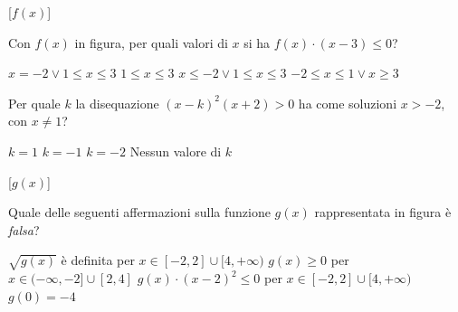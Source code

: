 \documentclass[10pt]{article}
\begin{document}
\smallskip
\noindent
\begin{minipage}[c]{.35\linewidth}
  \centering
  \begin{ftplot}[quiz, xmin=-3.9, xmax=3.9, ymin=-3.9, ymax=3.9, legend pos=north west]
    [$f(x)$]
  \end{ftplot}
\end{minipage}\hfill
\begin{minipage}[c]{.64\linewidth}
  \begin{parts}[ragged]
    \itemx[pts=0.5, diff=3] Con $f(x)$ in figura, per quali valori di $x$ si ha $f(x) \cdot (x - 3) \leq 0$?
      \begin{choices}
        \correct $x = -2 \lor 1 \leq x \leq 3$
        \choice $1 \leq x \leq 3$
        \choice $x \leq -2 \lor 1 \leq x \leq 3$
        \choice $-2 \leq x \leq 1 \lor x \geq 3$
      \end{choices}
  \end{parts}
\end{minipage}

\begin{parts}
  \itemx[pts=0.5, diff=3] Per quale $k$ la disequazione $(x - k)^2(x + 2) > 0$ ha come soluzioni $x > -2$, con $x \neq 1$?
    \begin{choices}
      \correct $k = 1$
      \choice $k = -1$
      \choice $k = -2$
      \choice[fixed] Nessun valore di $k$
    \end{choices}
\end{parts}

\smallskip
\noindent
\begin{minipage}[c]{.35\linewidth}
  \centering
  \begin{ftplot}[quiz, xmin=-3.9, xmax=5.9, ymin=-4.9, ymax=4.9, legend pos=north east]
    [$g(x)$]
  \end{ftplot}
\end{minipage}\hfill
\begin{minipage}[c]{.64\linewidth}
  \begin{parts}[ragged]
    \itemx[pts=0.5, diff=3] Quale delle seguenti affermazioni sulla funzione $g(x)$ rappresentata in figura è \emph{falsa}?
      \begin{choices}[cols=1]
        \correct $\sqrt{g(x)}$ è definita per $x \in [-2, 2] \cup [4, +\infty)$
        \choice $g(x) \geq 0$ per $x \in (-\infty, -2] \cup [2, 4]$
        \choice $g(x) \cdot (x - 2)^2 \leq 0$ per $x \in [-2, 2] \cup [4, +\infty)$
        \choice $g(0) = -4$
      \end{choices}
  \end{parts}
\end{minipage}
\end{document}
